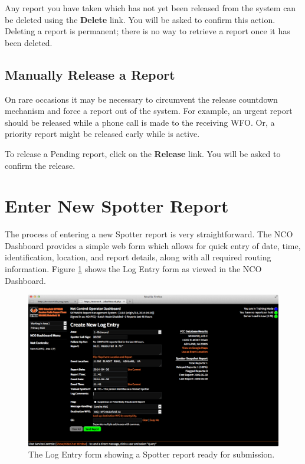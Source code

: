 \documentclass[pdflatex,letterpaper,twoside,12pt]{book}
\begin{document}
Any report you have taken which has not yet been released from the system can be deleted using the \textbf{Delete} link.  You will be asked to confirm this action.  Deleting a report is permanent;  there is no way to retrieve a report once it has been deleted.

\subsection{Manually Release a Report}\label{manual-release}

On rare occasions it may be necessary to circumvent the release countdown mechanism and force a report out of the system.  For example, an urgent report should be released while a phone call is made to the receiving WFO.  Or, a priority report might be released early while  is active.

To release a Pending report, click on the \textbf{Release} link.  You will be asked to confirm the release.



\section{Enter New Spotter Report}\label{dash-new-report}

The process of entering a new Spotter report is very straightforward.  The NCO Dashboard provides a simple web form which allows for quick entry of date, time, identification, location, and report details, along with all required routing information.  Figure \ref{fig:dash-report-create} shows the Log Entry form as viewed in the NCO Dashboard.

\begin{figure}[h]
  \centering
  \includegraphics[width=\textwidth,keepaspectratio=true]{img/dash-report-create}
  \caption{The Log Entry form showing a Spotter report ready for submission.\label{fig:dash-report-create}}
\end{figure}
\end{document}
